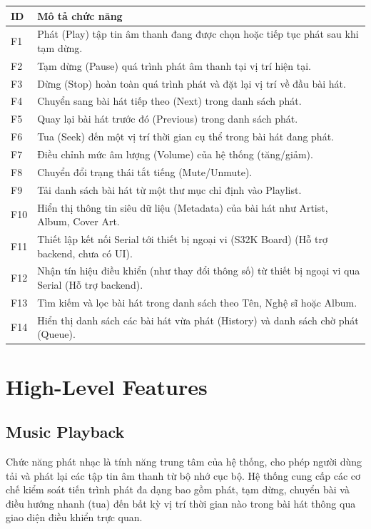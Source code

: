 \documentclass{article}
\begin{document}
\begin{center}
\renewcommand{\arraystretch}{1.5}
\begin{tabular}{|l|p{12cm}|}
\hline
\textbf{ID} & \textbf{Mô tả chức năng} \\ \hline
F1 & Phát (Play) tập tin âm thanh đang được chọn hoặc tiếp tục phát sau khi tạm dừng. \\ \hline
F2 & Tạm dừng (Pause) quá trình phát âm thanh tại vị trí hiện tại. \\ \hline
F3 & Dừng (Stop) hoàn toàn quá trình phát và đặt lại vị trí về đầu bài hát. \\ \hline
F4 & Chuyển sang bài hát tiếp theo (Next) trong danh sách phát. \\ \hline
F5 & Quay lại bài hát trước đó (Previous) trong danh sách phát. \\ \hline
F6 & Tua (Seek) đến một vị trí thời gian cụ thể trong bài hát đang phát. \\ \hline
F7 & Điều chỉnh mức âm lượng (Volume) của hệ thống (tăng/giảm). \\ \hline
F8 & Chuyển đổi trạng thái tắt tiếng (Mute/Unmute). \\ \hline
F9 & Tải danh sách bài hát từ một thư mục chỉ định vào Playlist. \\ \hline
F10 & Hiển thị thông tin siêu dữ liệu (Metadata) của bài hát như Artist, Album, Cover Art. \\ \hline
F11 & Thiết lập kết nối Serial tới thiết bị ngoại vi (S32K Board) (Hỗ trợ backend, chưa có UI). \\ \hline
F12 & Nhận tín hiệu điều khiển (như thay đổi thông số) từ thiết bị ngoại vi qua Serial (Hỗ trợ backend). \\ \hline
F13 & Tìm kiếm và lọc bài hát trong danh sách theo Tên, Nghệ sĩ hoặc Album. \\ \hline
F14 & Hiển thị danh sách các bài hát vừa phát (History) và danh sách chờ phát (Queue). \\ \hline
\end{tabular}
\end{center}

\section{High-Level Features}
\subsection{Music Playback}
Chức năng phát nhạc là tính năng trung tâm của hệ thống, cho phép người dùng tải và phát lại các tập tin âm thanh từ bộ nhớ cục bộ. Hệ thống cung cấp các cơ chế kiểm soát tiến trình phát đa dạng bao gồm phát, tạm dừng, chuyển bài và điều hướng nhanh (tua) đến bất kỳ vị trí thời gian nào trong bài hát thông qua giao diện điều khiển trực quan.
\end{document}
